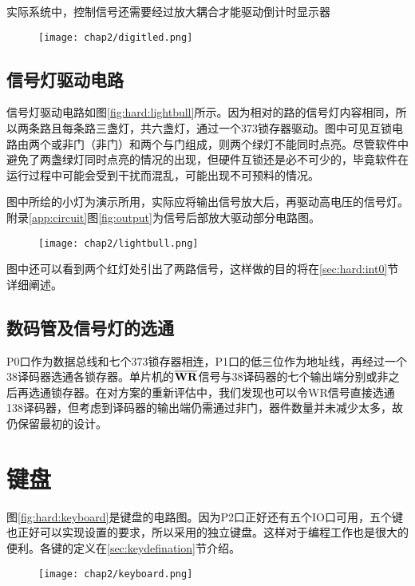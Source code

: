 	实际系统中，控制信号还需要经过放大耦合才能驱动倒计时显示器
	\begin{figure}[!tbh]
	\centering
	\texttt{[image: chap2/digitled.png]}
	\end{figure}
	
	\subsection{信号灯驱动电路} \label{sec:hard:lightbull}
	信号灯驱动电路如图\ref{fig:hard:lightbull}所示。因为相对的路的信号灯内容相同，所以两条路且每条路三盏灯，共六盏灯，通过一个373锁存器驱动。图中可见互锁电路由两个或非门（非门）和两个与门组成，则两个绿灯不能同时点亮。尽管软件中避免了两盏绿灯同时点亮的情况的出现，但硬件互锁还是必不可少的，毕竟软件在运行过程中可能会受到干扰而混乱，可能出现不可预料的情况。
	
	图中所绘的小灯为演示所用，实际应将输出信号放大后，再驱动高电压的信号灯。附录\ref{app:circuit}图\ref{fig:output}为信号后部放大驱动部分电路图。
	\begin{figure}[!tbh]
	\centering
	\texttt{[image: chap2/lightbull.png]}
	\end{figure}
	
	图中还可以看到两个红灯处引出了两路信号，这样做的目的将在\ref{sec:hard:int0}节详细阐述。
	
	\subsection{数码管及信号灯的选通}
	P0口作为数据总线和七个373锁存器相连，P1口的低三位作为地址线，再经过一个38译码器选通各锁存器。单片机的$\bf \overline{WR}$信号与38译码器的七个输出端分别或非之后再选通锁存器。在对方案的重新评估中，我们发现也可以令WR信号直接选通138译码器，但考虑到译码器的输出端仍需通过非门，器件数量并未减少太多，故仍保留最初的设计。

\section{键盘}
	图\ref{fig:hard:keyboard}是键盘的电路图。因为P2口正好还有五个IO口可用，五个键也正好可以实现设置的要求，所以采用的独立键盘。这样对于编程工作也是很大的便利。各键的定义在\ref{sec:keydefination}节介绍。
	\begin{figure}[!tbh]
	\centering
	\texttt{[image: chap2/keyboard.png]}
	\end{figure}
	
